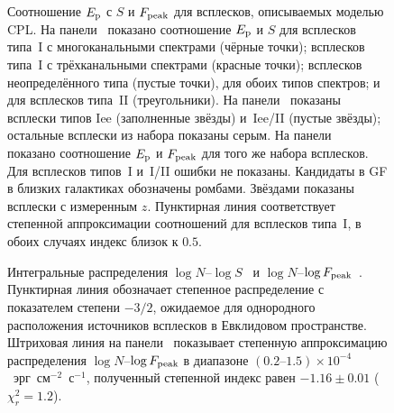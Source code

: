 \begin{figure}
	\begin{center}
		\begin{minipage}[t]{1\textwidth}
		\end{minipage}
		\begin{minipage}[t]{1\textwidth}
		\end{minipage}
	\end{center}
\caption{
    Соотношение $E_{\mathrm{p}}$ с $S$ и $F_{\mathrm{peak}}$ для всплесков, описываемых моделью CPL.
    На панели~ показано соотношение $E_{\mathrm{p}}$ и $S$ для
    всплесков типа~I с многоканальными спектрами (чёрные точки); 
    всплесков типа~I с трёхканальными спектрами (красные точки); 
    всплесков неопределённого типа (пустые точки), для обоих типов спектров;
    и для всплесков типа~II (треугольники). 
    На панели~ показаны всплески типов Iee (заполненные звёзды) и~Iee/II (пустые звёзды);
    остальные всплески из набора показаны серым.
    На панели~ показано соотношение $E_{\mathrm{p}}$ и $F_{\mathrm{peak}}$ 
    для того же набора всплесков. Для всплесков типов~I и~I/II ошибки не показаны.
    Кандидаты в GF в близких галактиках обозначены ромбами. Звёздами показаны всплески с измеренным $z$.
    Пунктирная линия соответствует степенной аппроксимации соотношений для всплесков типа~I,
    в обоих случаях индекс близок к $0.5$.
    \label{fig:EpvsFPandFL}}
\end{figure}

\begin{figure}
	\begin{center}
	\end{center}
\caption{
    Интегральные распределения $\log N$--$\log S$~ и
    $\log N$--$\log F_{\mathrm{peak}}$~.
    Пунктирная линия обозначает степенное распределение с показателем степени $-3/2$,
    ожидаемое для однородного расположения источников всплесков в Евклидовом пространстве.
    Штриховая линия на панели~ показывает степенную аппроксимацию
    распределения $\log N$--$\log F_{\mathrm{peak}}$ в диапазоне  
    $(0.2\textrm{--}1.5)\times 10^{-4}$~эрг~см$^{-2}$~с$^{-1}$, полученный степенной индекс
    равен $-1.16\pm0.01$ ($\chi^2_r = 1.2$).
    \label{fig:logNlogS_PF} }
\end{figure}
